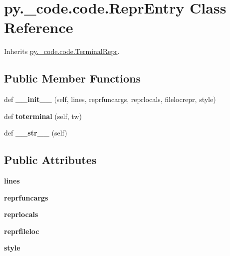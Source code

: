 \hypertarget{classpy_1_1__code_1_1code_1_1_repr_entry}{}\section{py.\+\_\+code.\+code.\+Repr\+Entry Class Reference}
\label{classpy_1_1__code_1_1code_1_1_repr_entry}


Inherits \hyperlink{classpy_1_1__code_1_1code_1_1_terminal_repr}{py.\+\_\+code.\+code.\+Terminal\+Repr}.

\subsection*{Public Member Functions}
\begin{DoxyCompactItemize}
\item 
\mbox{\label{classpy_1_1__code_1_1code_1_1_repr_entry_af64654ac0ad089c292c9a1a6d33c3001}} 
def {\bfseries \+\_\+\+\_\+init\+\_\+\+\_\+} (self, lines, reprfuncargs, reprlocals, filelocrepr, style)
\item 
\mbox{\label{classpy_1_1__code_1_1code_1_1_repr_entry_af2a75b896dd88df6f453b8a1a10a9a15}} 
def {\bfseries toterminal} (self, tw)
\item 
\mbox{\label{classpy_1_1__code_1_1code_1_1_repr_entry_a1f6b2ccaedcddf92d1e5daf227881ea9}} 
def {\bfseries \+\_\+\+\_\+str\+\_\+\+\_\+} (self)
\end{DoxyCompactItemize}
\subsection*{Public Attributes}
\begin{DoxyCompactItemize}
\item 
\mbox{\label{classpy_1_1__code_1_1code_1_1_repr_entry_a43a8a8d6262a2012b7174cb2beea5b39}} 
{\bfseries lines}
\item 
\mbox{\label{classpy_1_1__code_1_1code_1_1_repr_entry_aa7fff2d769883bd9f1719ceaae6f01e3}} 
{\bfseries reprfuncargs}
\item 
\mbox{\label{classpy_1_1__code_1_1code_1_1_repr_entry_a33b21c46f7c47b1e3e252631c3db33d2}} 
{\bfseries reprlocals}
\item 
\mbox{\label{classpy_1_1__code_1_1code_1_1_repr_entry_ab7caa2bf92fe855e789dc331f48f222c}} 
{\bfseries reprfileloc}
\item 
\mbox{\label{classpy_1_1__code_1_1code_1_1_repr_entry_a657c35100510f3f27dccc1fbf4f5c35f}} 
{\bfseries style}
\end{DoxyCompactItemize}
